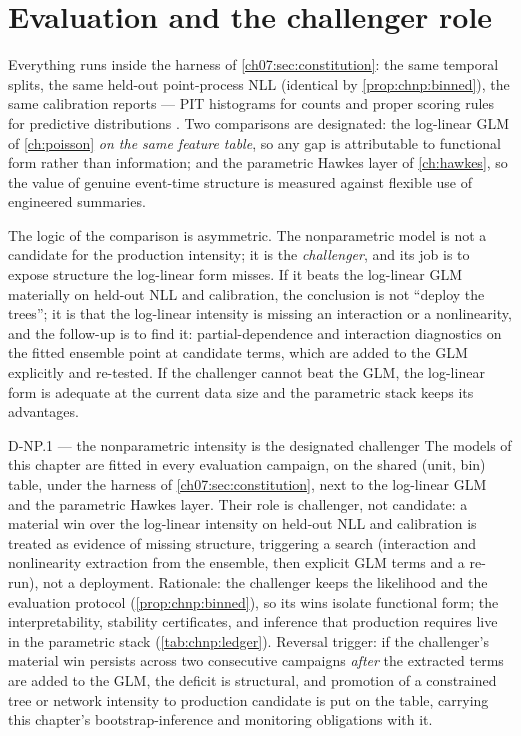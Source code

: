 \section{Evaluation and the challenger role}\label{chnp:sec:evaluation}

Everything runs inside the harness of \cref{ch07:sec:constitution}: the
same temporal splits, the same held-out point-process NLL (identical by
\cref{prop:chnp:binned}), the same calibration reports --- PIT
histograms for counts and proper scoring rules for predictive
distributions \citep{gneitingraftery2007}. Two comparisons are
designated: the log-linear GLM of \cref{ch:poisson} \emph{on the same
feature table}, so any gap is attributable to functional form rather
than information; and the parametric Hawkes layer of \cref{ch:hawkes},
so the value of genuine event-time structure is measured against
flexible use of engineered summaries.

The logic of the comparison is asymmetric. The nonparametric model is
not a candidate for the production intensity; it is the
\emph{challenger}, and its job is to expose structure the log-linear
form misses. If it beats the log-linear GLM materially on held-out NLL
and calibration, the conclusion is not ``deploy the trees''; it is that
the log-linear intensity is missing an interaction or a nonlinearity,
and the follow-up is to find it: partial-dependence and interaction
diagnostics on the fitted ensemble point at candidate terms, which are
added to the GLM explicitly and re-tested. If the challenger cannot beat
the GLM, the log-linear form is adequate at the current data size and
the parametric stack keeps its advantages.

\begin{decision}{D-NP.1 --- the nonparametric intensity is the
designated challenger}
The models of this chapter are fitted in every evaluation campaign, on
the shared (unit, bin) table, under the harness of
\cref{ch07:sec:constitution}, next to the log-linear GLM and the
parametric Hawkes layer. Their role is challenger, not candidate: a
material win over the log-linear intensity on held-out NLL and
calibration is treated as evidence of missing structure, triggering a
search (interaction and nonlinearity extraction from the ensemble, then
explicit GLM terms and a re-run), not a deployment. Rationale: the
challenger keeps the likelihood and the evaluation protocol
(\cref{prop:chnp:binned}), so its wins isolate functional form; the
interpretability, stability certificates, and inference that production
requires live in the parametric stack (\cref{tab:chnp:ledger}).
Reversal trigger: if the challenger's material win persists across two
consecutive campaigns \emph{after} the extracted terms are added to the
GLM, the deficit is structural, and promotion of a constrained tree or
network intensity to production candidate is put on the table, carrying
this chapter's bootstrap-inference and monitoring obligations with it.
\end{decision}

